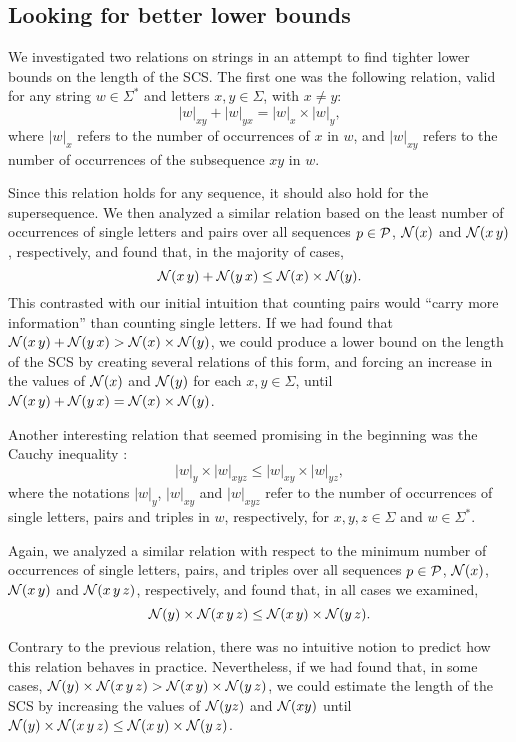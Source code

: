\subsection{Looking for better lower bounds}

We investigated two relations on strings in an attempt to find tighter lower
bounds on the length of the SCS. The first one was the following relation, valid
for any string $w \in \Sigma^\ast$ and letters $x,y \in \Sigma$, with $x \ne y$:
\[
|w|_{xy} + |w|_{yx} = |w|_{x} \times |w|_{y},
\]
where $|w|_{x}$ refers to the number of occurrences of $x$ in $w$, and
$|w|_{xy}$ refers to the number of occurrences of the subsequence $xy$ in $w$.

Since this relation holds for any sequence, it should also hold for the
supersequence. We then analyzed a similar relation based on the
least number of occurrences of single letters and pairs over all sequences
$p \in {\mathcal{P}}$, ${\mathcal{N}}(x)$
and ${\mathcal{N}}(x \, y)$, respectively, and found that, in the majority of cases,
\[
{\mathcal{N}}(x \, y) + {\mathcal{N}}(y \, x) \leq {\mathcal{N}}(x) \times {\mathcal{N}}(y).
\]
This contrasted with our initial intuition that counting pairs would ``carry
more information'' than counting single letters. If we had found that
${\mathcal{N}}(x \, y) + {\mathcal{N}}(y \, x) > {\mathcal{N}}(x) \times {\mathcal{N}}(y)$, we could produce a
lower bound on the length of the SCS by creating several relations of this form,
and forcing an increase in the values of ${\mathcal{N}}(x)$ and ${\mathcal{N}}(y)$ for each
$x,y \in \Sigma$, until
${\mathcal{N}}(x \, y) + {\mathcal{N}}(y \, x) = {\mathcal{N}}(x) \times {\mathcal{N}}(y)$.

Another interesting relation that seemed promising in the beginning was the
Cauchy inequality \citep{Salomaa2003,Mateescu2004}:
\[
|w|_{y} \times |w|_{xyz} \leq |w|_{xy} \times |w|_{yz},
\]
where the notations $|w|_{y}$, $|w|_{xy}$ and $|w|_{xyz}$ refer to the number of
occurrences of single letters, pairs and triples in $w$, respectively, for
$x, y, z \in \Sigma$ and $w \in \Sigma^\ast$.

Again, we analyzed a similar relation with respect to the minimum number of
occurrences of single letters, pairs, and triples over all sequences
$p \in {\mathcal{P}}$, ${\mathcal{N}}(x)$, ${\mathcal{N}}(x \, y)$ and ${\mathcal{N}}(x \, y \, z)$,
respectively, and found that, in all cases we examined,
\[
{\mathcal{N}}(y) \times {\mathcal{N}}(x \, y \, z) \leq {\mathcal{N}}(x \, y) \times {\mathcal{N}}(y \,z).
\]

Contrary to the previous relation, there was no intuitive notion to predict how
this relation behaves in practice. Nevertheless, if we had found that, in some
cases, ${\mathcal{N}}(y) \times {\mathcal{N}}(x \, y \, z) > {\mathcal{N}}(x \, y) \times {\mathcal{N}}(y \,z)$,
we could estimate the length of the SCS by increasing the values of ${\mathcal{N}}(yz)$
and ${\mathcal{N}}(xy)$ until
${\mathcal{N}}(y) \times {\mathcal{N}}(x \, y \, z) \leq {\mathcal{N}}(x \, y) \times {\mathcal{N}}(y \,z)$.

